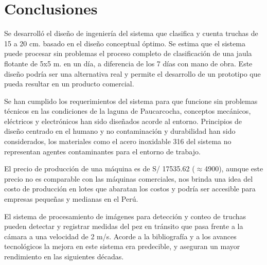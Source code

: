 
\pagestyle{myportland}
\doublespacing
\chapter*{\centering \large Conclusiones}
\thispagestyle{myportland}

Se desarrolló el diseño de ingeniería del sistema que clasifica y cuenta truchas de 15 a 20 cm. basado en el diseño conceptual óptimo. Se estima que el sistema puede procesar sin problemas el proceso completo de clasificación de una jaula flotante de 5x5 m. en un día, a diferencia de los 7 días con mano de obra. Este diseño podría ser una alternativa real y permite el desarrollo de un prototipo que pueda resultar en un producto comercial.

Se han cumplido los requerimientos del sistema para que funcione sin problemas técnicos en las condiciones de la laguna de Paucarcocha, conceptos mecánicos, eléctricos y electrónicos han sido diseñados acorde al entorno. Principios de diseño centrado en el humano y no contaminación y durabilidad han sido considerados, los materiales como el acero inoxidable 316 del sistema no representan agentes contaminantes para el entorno de trabajo.

El precio de producción de una máquina es de S/ 17535.62 ($\approx$4900), aunque este precio no es comparable con las máquinas comerciales, nos brinda una idea del costo de producción en lotes que abaratan los costos y podría ser accesible para empresas pequeñas y medianas en el Perú.

El sistema de procesamiento de imágenes para detección y conteo de truchas pueden detectar y registrar medidas del pez en tránsito que pasa frente a la cámara a una velocidad de 2 m/s. Acorde a la bibliografía y a los avances tecnológicos la mejora en este sistema era predecible, y aseguran un mayor rendimiento en las siguientes décadas.
